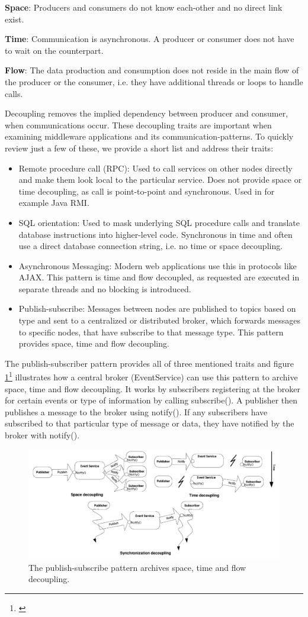 \noindent \textbf{Space}: Producers and consumers do not know each-other and no direct link exist.

\noindent \textbf{Time}: Communication is asynchronous. A producer or consumer does not have to wait on the counterpart.

\noindent \textbf{Flow}: The data production and consumption does not reside in the main flow of the producer or the consumer, i.e. they have additional threads or loops to handle calls.

\noindent Decoupling removes the implied dependency between producer and consumer, when communications occur. These decoupling traits are important when examining middleware applications and its communication-patterns. To quickly review just a few of these, we provide a short list and address their traits:

\begin{itemize}
	\item Remote procedure call (RPC): Used to call services on other nodes directly and make them look local to the particular service. Does not provide space or time decoupling, as call is point-to-point and synchronous. Used in for example Java RMI.
	\item SQL orientation: Used to mask underlying SQL procedure calls and translate database instructions into higher-level code. Synchronous in time and often use a direct database connection string, i.e. no time or space decoupling.
	\item Asynchronous Messaging: Modern web applications use this in protocols like AJAX. This pattern is time and flow decoupled, as requested are executed in separate threads and no blocking is introduced.
	\item Publish-subscribe: Messages between nodes are published to topics based on type and sent to a centralized or distributed broker, which forwards messages to specific nodes, that have subscribe to that message type. This pattern provides space, time and flow decoupling.
\end{itemize}

\noindent The publish-subscriber pattern provides all of three mentioned traits and figure \ref{fig:pubsub}\footnote{\cite{Eugster2003}} illustrates how a central broker (EventService) can use this pattern to archive space, time and flow decoupling. It works by subscribers registering at the broker for certain events or type of information by calling subscribe(). A publisher then publishes a message to the broker using notify(). If any subscribers have subscribed to that particular type of message or data, they have notified by the broker with notify().

\begin{figure}[h!]\label{}
	\centering
	\includegraphics[scale=0.6]{middleware/pubsub.png}
	\caption{The publish-subscribe pattern archives space, time and flow decoupling.}
	\label{fig:pubsub}
\end{figure}